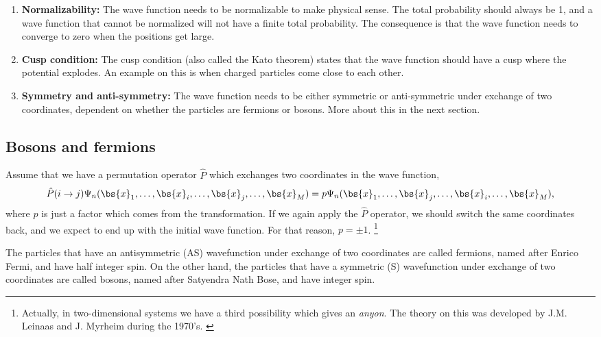 \begin{enumerate}
	\item \textbf{Normalizability:} The wave function needs to be normalizable to make physical sense. The total probability should always be 1, and a wave function that cannot be normalized will not have a finite total probability. The consequence is that the wave function needs to converge to zero when the positions get large. 
	
	\item \textbf{Cusp condition:} The cusp condition (also called the Kato theorem) states that the wave function should have a cusp where the potential explodes. An example on this is when charged particles come close to each other. 
	
	\item \textbf{Symmetry and anti-symmetry:} The wave function needs to be either symmetric or anti-symmetric under exchange of two coordinates, dependent on whether the particles are fermions or bosons. More about this in the next section.
\end{enumerate}

\subsection{Bosons and fermions} \label{subsubsec:symmetry}
Assume that we have a permutation operator $\hat{P}$ which exchanges two coordinates in the wave function,
\begin{equation}
\hat{P}(i\rightarrow j)\Psi_n(\bs{x}_1,\hdots,\bs{x}_i,\hdots,\bs{x}_j,\hdots,\bs{x}_M)=p\Psi_n(\bs{x}_1,\hdots,\bs{x}_j,\hdots,\bs{x}_i,\hdots,\bs{x}_M),
\end{equation}
where $p$ is just a factor which comes from the transformation. If we again apply the $\hat{P}$ operator, we should switch the same coordinates back, and we expect to end up with the initial wave function. For that reason, $p=\pm1$. \footnote{Actually, in two-dimensional systems we have a third possibility which gives an \textit{anyon}. The theory on this was developed by J.M. Leinaas and J. Myrheim during the 1970's. \cite{leinaas_one_1977}}

The particles that have an antisymmetric (AS) wavefunction under exchange of two coordinates are called fermions, named after Enrico Fermi, and have half integer spin. On the other hand, the particles that have a symmetric (S) wavefunction under exchange of two coordinates are called bosons, named after Satyendra Nath Bose, and have integer spin. 

